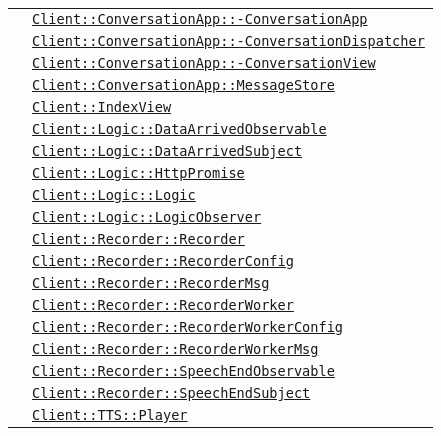 \begin{longtable}{|>{\centering}m{3cm}|m{10cm}<{\centering}|}
& \hyperref[Client::ConversationApp::ConversationApp]{\texttt{Client::ConversationApp::-\linebreak ConversationApp}}\\
& \hyperref[Client::ConversationApp::ConversationDispatcher]{\texttt{Client::ConversationApp::-\linebreak ConversationDispatcher}}\\
& \hyperref[Client::ConversationApp::ConversationView]{\texttt{Client::ConversationApp::-\linebreak ConversationView}}\\
& \hyperref[Client::ConversationApp::MessageStore]{\texttt{Client::ConversationApp::MessageStore}}\\
& \hyperref[Client::IndexView]{\texttt{Client::IndexView}}\\
& \hyperref[Client::Logic::DataArrivedObservable]{\texttt{Client::Logic::DataArrivedObservable}}\\
& \hyperref[Client::Logic::DataArrivedSubject]{\texttt{Client::Logic::DataArrivedSubject}}\\
& \hyperref[Client::Logic::HttpPromise]{\texttt{Client::Logic::HttpPromise}}\\
& \hyperref[Client::Logic::Logic]{\texttt{Client::Logic::Logic}}\\
& \hyperref[Client::Logic::LogicObserver]{\texttt{Client::Logic::LogicObserver}}\\
& \hyperref[Client::Recorder::Recorder]{\texttt{Client::Recorder::Recorder}}\\
& \hyperref[Client::Recorder::RecorderConfig]{\texttt{Client::Recorder::RecorderConfig}}\\
& \hyperref[Client::Recorder::RecorderMsg]{\texttt{Client::Recorder::RecorderMsg}}\\
& \hyperref[Client::Recorder::RecorderWorker]{\texttt{Client::Recorder::RecorderWorker}}\\
& \hyperref[Client::Recorder::RecorderWorkerConfig]{\texttt{Client::Recorder::RecorderWorkerConfig}}\\
& \hyperref[Client::Recorder::RecorderWorkerMsg]{\texttt{Client::Recorder::RecorderWorkerMsg}}\\
& \hyperref[Client::Recorder::SpeechEndObservable]{\texttt{Client::Recorder::SpeechEndObservable}}\\
& \hyperref[Client::Recorder::SpeechEndSubject]{\texttt{Client::Recorder::SpeechEndSubject}}\\
& \hyperref[Client::TTS::Player]{\texttt{Client::TTS::Player}}\\

\end{longtable}

